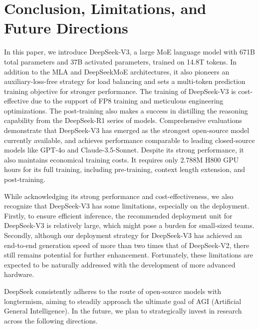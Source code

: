\documentclass[11pt,a4paper]{article}
\begin{document}
\section{Conclusion, Limitations, and Future Directions}

In this paper, we introduce DeepSeek-V3, a large MoE language model with 671B total parameters and 37B activated parameters, trained on 14.8T tokens. 
In addition to the MLA and DeepSeekMoE architectures, it also pioneers an auxiliary-loss-free strategy for load balancing and sets a multi-token prediction training objective for stronger performance.
The training of DeepSeek-V3 is cost-effective due to the support of FP8 training and meticulous engineering optimizations. 
The post-training also makes a success in distilling the reasoning capability from the DeepSeek-R1 series of models.
Comprehensive evaluations demonstrate that DeepSeek-V3 has emerged as the strongest open-source model currently available, and achieves performance comparable to leading closed-source models like GPT-4o and Claude-3.5-Sonnet. 
Despite its strong performance, it also maintains economical training costs. 
It requires only 2.788M H800 GPU hours for its full training, including pre-training, context length extension, and post-training.

While acknowledging its strong performance and cost-effectiveness, we also recognize that DeepSeek-V3 has some limitations, especially on the deployment.
Firstly, to ensure efficient inference, the recommended deployment unit for DeepSeek-V3 is relatively large, which might pose a burden for small-sized teams.
Secondly, although our deployment strategy for DeepSeek-V3 has achieved an end-to-end generation speed of more than two times that of DeepSeek-V2, there still remains potential for further enhancement.
Fortunately, these limitations are expected to be naturally addressed with the development of more advanced hardware.

DeepSeek consistently adheres to the route of open-source models with longtermism, aiming to steadily approach the ultimate goal of AGI (Artificial General Intelligence).
In the future, we plan to strategically invest in research across the following directions.
\end{document}
